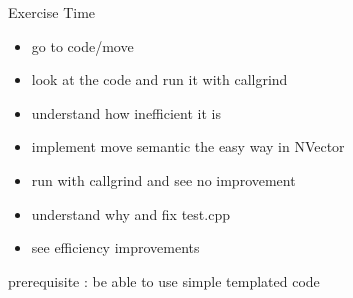 \begin{frame}[fragile]
  \begin{alertblock}{Exercise Time}
    \begin{itemize}
    \item go to code/move
    \item look at the code and run it with callgrind
    \item understand how inefficient it is
    \item implement move semantic the easy way in NVector
    \item run with callgrind and see no improvement
    \item understand why and fix test.cpp
    \item see efficiency improvements
    \end{itemize}
  \end{alertblock}
  prerequisite : be able to use simple templated code
\end{frame}
